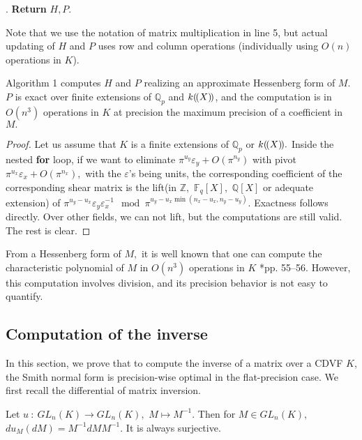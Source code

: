 \documentclass{sig-alternate-05-2015}
\newcommand{\Q}{\mathbb Q}
\newcommand{\Fq}{\mathbb{F}_q}
\newcommand{\llp}{(\mkern-2.5mu(}
\newcommand{\rrp}{)\mkern-2.5mu)}
\begin{document}
. \textbf{Return} $H,P.$

\vspace{-1ex}\noindent\hrulefill

\medskip

Note that we use the notation of matrix multiplication in line 5, but actual updating of
$H$ and $P$ uses row and column operations (individually using $O(n)$ operations in $K$).

\begin{prop} 
Algorithm 1 computes $H$ and $P$ realizing an approximate Hessenberg form of $M$.
$P$ is exact over finite extensions of $\mathbb{Q}_p$ and $k\llp X\rrp$, and the computation is in $O(n^3)$ operations in $K$ at precision the maximum precision of a coefficient in $M.$
\end{prop}
\begin{proof}
Let us assume that $K$ is a finite extensions of $\mathbb{Q}_p$ or $k\llp X \rrp.$
Inside the nested \textbf{for} loop, if we want to eliminate $\pi^{u_y} \varepsilon_y+O(\pi^{n_y})$ with pivot $\pi^{u_x} \varepsilon_x+O(\pi^{n_x}),$
with the $\varepsilon$'s being units,
the corresponding coefficient of the corresponding shear matrix is the lift(in $\mathbb{Z}, $  $\Fq[X],$ $\Q[X]$ or adequate extension) of $\pi^{u_y-u_x} \varepsilon_y \varepsilon_x^{-1} \mod \pi^{u_y-u_x\min (n_x-u_x,n_y-u_y)}.$
Exactness follows directly. Over other fields, we can not lift, but the computations are still valid.
The rest is clear.
\end{proof}

\begin{rem} \label{rem:char_pol_from_hessenberg}
From a Hessenberg form of $M,$ it is well known
that one can compute the characteristic polynomial of 
$M$ in $O(n^3)$ operations in $K$ \cite{Cohen:2013}*{pp. 55--56}.
However, this computation involves division, and its
precision behavior is not easy to quantify.
\end{rem}


\subsection{Computation of the inverse}

In this section, we prove that to compute the inverse of
a matrix over a CDVF $K$, the Smith normal form is precision-wise optimal in the flat-precision case.
We first recall the differential of matrix inversion.

\begin{lem}
Let $u \: : \: GL_n (K) \rightarrow GL_n(K),$ $M \mapsto M^{-1}.$
Then for $M \in GL_n (K),$ $du_M(dM)=M^{-1} dM M^{-1}.$
It is always surjective.
\end{lem}
\end{document}
